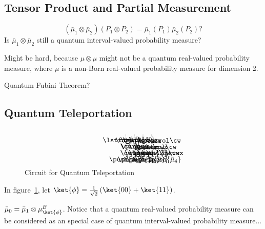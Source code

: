 \documentclass{article}
\theoremstyle{remark}
\newcommand{\xyC}[1]{\xymatrixcolsep={#1}}
\begin{document}


\subsection{Tensor Product and Partial Measurement}

\[
\left(\bar{\mu}_{1}\otimes\bar{\mu}_{2}\right)\left(P_{1}\otimes P_{2}\right)=\bar{\mu}_{1}\left(P_{1}\right)\bar{\mu}_{2}\left(P_{2}\right)?
\]
Is $\bar{\mu}_{1}\otimes\bar{\mu}_{2}$ still a quantum interval-valued
probability measure?

Might be hard, because $\mu\otimes\mu$ might not be a quantum real-valued
probability measure, where $\mu$ is a non-Born real-valued probability
measure for dimension 2.

Quantum Fubini Theorem?



\subsection{Quantum Teleportation}

\begin{figure}[t]
\[
\begin{array}{c}
\hspace{1cm}\xyC{.6em}\entrymodifiers={@*=<0em>}\xymatrix@R=0.9em{ & \ar@{.}[dddd] &  & \ar@{.}[dddd] &  & \ar@{.}[dddd] &  & \ar@{.}[dddd]\\
\lstick{\bar{\mu}} & \qw & \ctrl{1} & \qw & \gate{H} & \qw & \meter & \cw & \cw & \control\cw\\
 & \qw & \targ & \qw & \qw & \qw & \meter & \cw & \control\cw & \cwx & \ar@{.}[dd]\\
 & \qw & \qw & \qw & \qw & \qw & \qw & \qw & \gate{X}\cwx & \gate{Z}\cwx & \qw\\
 & \push{\bar{\mu}_{0}} &  & \push{\bar{\mu}_{1}} &  & \push{\bar{\mu}_{2}} &  & \push{\bar{\mu}_{3}} &  &  & \push{\bar{\mu}_{4}}
}
\end{array}
\]
\caption{\label{fig:QuantumTeleportation}Circuit for Quantum Teleportation}
\end{figure}

In figure~\ref{fig:QuantumTeleportation}, let $\ket{\phi}=\frac{1}{\sqrt{2}}\left(\ket{00}+\ket{11}\right)$.

$\bar{\mu}_{0}=\bar{\mu}_{1}\otimes\mu_{\ket{\phi}}^{B}$. Notice
that a quantum real-valued probability measure can be considered as
an special case of quantum interval-valued probability measure...
\end{document}
